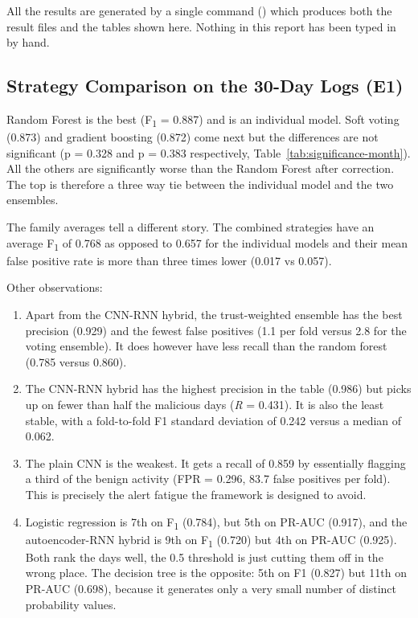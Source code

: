 \documentclass[a4paper,12pt]{article}
\newcommand{\resultinput}[1]{{\let\small\footnotesize\setlength{\tabcolsep}{4pt}}}
\begin{document}
All the results are generated by a single command () which produces both the result files and the tables shown here. Nothing in this report has been typed in by hand.

\subsection{Strategy Comparison on the 30-Day Logs (E1)}
\label{sec:8.1}

\resultinput{tables/resultsMonth}

Random Forest is the best (F\textsubscript{1} = 0.887) and is an individual model. Soft voting (0.873) and gradient boosting (0.872) come next but the differences are not significant (p = 0.328 and p = 0.383 respectively, Table~\ref{tab:significance-month}). All the others are significantly worse than the Random Forest after correction. The top is therefore a three way tie between the individual model and the two ensembles.

The family averages tell a different story. The combined strategies have an average F\textsubscript{1} of 0.768 as opposed to 0.657 for the individual models and their mean false positive rate is more than three times lower (0.017 vs 0.057).

Other observations:

\begin{enumerate}
  \item Apart from the CNN-RNN hybrid, the trust-weighted ensemble has the best precision (0.929) and the fewest false positives (1.1 per fold versus 2.8 for the voting ensemble). It does however have less recall than the random forest (0.785 versus 0.860).
  \item The CNN-RNN hybrid has the highest precision in the table (0.986) but picks up on fewer than half the malicious days (\emph{R} = 0.431). It is also the least stable, with a fold-to-fold F1 standard deviation of 0.242 versus a median of 0.062.
  \item The plain CNN is the weakest. It gets a recall of 0.859 by essentially flagging a third of the benign activity (FPR = 0.296, 83.7 false positives per fold). This is precisely the alert fatigue the framework is designed to avoid.
  \item Logistic regression is 7th on F\textsubscript{1} (0.784), but 5th on PR-AUC (0.917), and the autoencoder-RNN hybrid is 9th on F\textsubscript{1} (0.720) but 4th on PR-AUC (0.925). Both rank the days well, the 0.5 threshold is just cutting them off in the wrong place. The decision tree is the opposite: 5th on F1 (0.827) but 11th on PR-AUC (0.698), because it generates only a very small number of distinct probability values.
\end{enumerate}
\resultinput{tables/significanceMonth}
\end{document}
